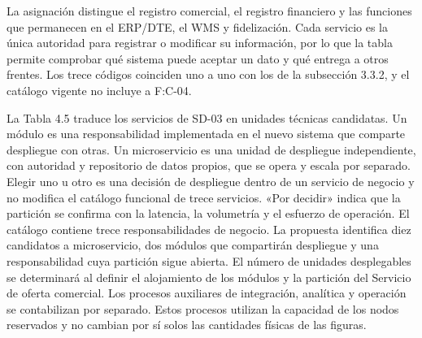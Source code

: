 \documentclass[11pt]{article}
\begin{document}
La asignación distingue el registro comercial, el registro financiero y las funciones que permanecen en el ERP/DTE, el WMS y fidelización. Cada servicio es la única autoridad para registrar o modificar su información, por lo que la tabla permite comprobar qué sistema puede aceptar un dato y qué entrega a otros frentes. Los trece códigos coinciden uno a uno con los de la subsección 3.3.2, y el catálogo vigente no incluye a F:C-04.

La Tabla 4.5 traduce los servicios de SD-03 en unidades técnicas candidatas. Un módulo es una responsabilidad implementada en el nuevo sistema que comparte despliegue con otras. Un microservicio es una unidad de despliegue independiente, con autoridad y repositorio de datos propios, que se opera y escala por separado. Elegir uno u otro es una decisión de despliegue dentro de un servicio de negocio y no modifica el catálogo funcional de trece servicios. «Por decidir» indica que la partición se confirma con la latencia, la volumetría y el esfuerzo de operación. El catálogo contiene trece responsabilidades de negocio. La propuesta identifica diez candidatos a microservicio, dos módulos que compartirán despliegue y una responsabilidad cuya partición sigue abierta. El número de unidades desplegables se determinará al definir el alojamiento de los módulos y la partición del Servicio de oferta comercial. Los procesos auxiliares de integración, analítica y operación se contabilizan por separado. Estos procesos utilizan la capacidad de los nodos reservados y no cambian por sí solos las cantidades físicas de las figuras.

\par\vspace{0pt plus 10\baselineskip}\vspace{0pt plus -10\baselineskip}
\end{document}

